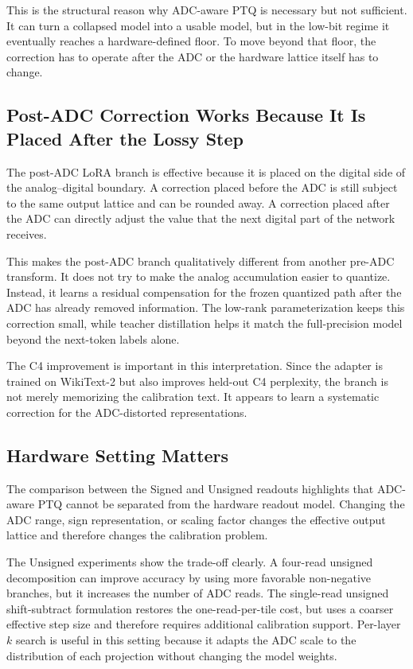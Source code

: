 \documentclass[a4paper,11pt,oneside]{article}
\theoremstyle{breakstyle}
\begin{document}
  This is the structural reason why ADC-aware PTQ is necessary but not
  sufficient.  It can turn a collapsed model into a usable model, but in
  the low-bit regime it eventually reaches a hardware-defined floor.  To
  move beyond that floor, the correction has to operate after the ADC or
  the hardware lattice itself has to change.

  \subsection{Post-ADC Correction Works Because It Is Placed After the Lossy Step}

  The post-ADC LoRA branch is effective because it is placed on the
  digital side of the analog--digital boundary.  A correction placed
  before the ADC is still subject to the same output lattice and can be
  rounded away.  A correction placed after the ADC can directly adjust
  the value that the next digital part of the network receives.

  This makes the post-ADC branch qualitatively different from another
  pre-ADC transform.  It does not try to make the analog accumulation
  easier to quantize.  Instead, it learns a residual compensation for
  the frozen quantized path after the ADC has already removed information.
  The low-rank parameterization keeps this correction small, while
  teacher distillation helps it match the full-precision model beyond
  the next-token labels alone.

  The C4 improvement is important in this interpretation.  Since the
  adapter is trained on WikiText-2 but also improves held-out C4
  perplexity, the branch is not merely memorizing the calibration text.
  It appears to learn a systematic correction for the ADC-distorted
  representations.

  \subsection{Hardware Setting Matters}

  The comparison between the Signed and Unsigned readouts highlights
  that ADC-aware PTQ cannot be separated from the hardware readout model.
  Changing the ADC range, sign representation, or scaling factor changes
  the effective output lattice and therefore changes the calibration
  problem.

  The Unsigned experiments show the trade-off clearly.  A four-read
  unsigned decomposition can improve accuracy by using more favorable
  non-negative branches, but it increases the number of ADC reads.  The
  single-read unsigned shift-subtract formulation restores the
  one-read-per-tile cost, but uses a coarser effective step size and
  therefore requires additional calibration support.  Per-layer \(k\)
  search is useful in this setting because it adapts the ADC scale to
  the distribution of each projection without changing the model weights.
\end{document}
